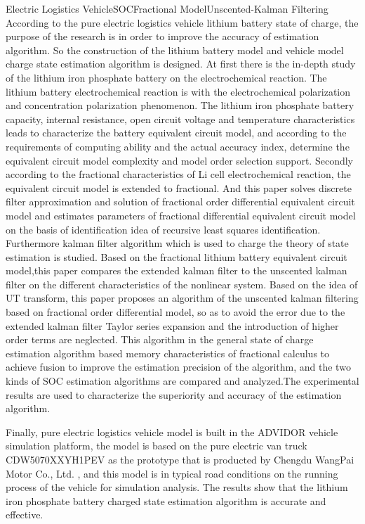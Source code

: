 \begin{Eabstract}{Electric Logistics Vehicle}{SOC}{Fractional Model}{Unscented-Kalman Filtering}{}
	According to the pure electric logistics vehicle lithium battery state of charge, the purpose of  the research is in order to improve the accuracy of estimation algorithm. So the construction of the lithium battery model and vehicle model charge state estimation algorithm is designed. At first there is the in-depth study of the lithium iron phosphate battery on the electrochemical reaction. The lithium battery electrochemical reaction is with the electrochemical polarization and concentration polarization phenomenon. The lithium iron phosphate battery capacity, internal resistance, open circuit voltage and temperature characteristics leads to characterize the battery equivalent circuit model, and according to the requirements of computing ability and the actual accuracy index, determine the equivalent circuit model complexity and model order selection support. Secondly according to the fractional characteristics of Li cell electrochemical reaction, the equivalent circuit model is extended to fractional. And this paper solves discrete filter approximation and solution of fractional order differential equivalent circuit model and estimates parameters of fractional differential equivalent circuit model on the basis of identification idea of recursive least squares identification. Furthermore kalman filter algorithm which is used to charge the theory of state estimation is studied. Based on the fractional lithium battery equivalent circuit model,this paper compares the extended kalman filter to the unscented kalman filter on the different characteristics of the nonlinear system. Based on the idea of UT transform, this paper proposes an algorithm of the unscented kalman filtering based on fractional order differential model, so as to avoid the error due to the extended kalman filter Taylor series expansion and the introduction of higher order terms are neglected. This algorithm in the general state of charge estimation algorithm based memory characteristics of fractional calculus to achieve fusion to improve the estimation precision of the algorithm, and the two kinds of SOC estimation algorithms are compared and analyzed.The experimental results are used to characterize the superiority and accuracy of the estimation algorithm.

	Finally, pure electric logistics vehicle model is built in the ADVIDOR vehicle simulation platform, the model is based on the pure electric van truck CDW5070XXYH1PEV as the prototype that is producted by Chengdu WangPai Motor Co., Ltd. , and this model is in typical road conditions on the running process of the vehicle for simulation analysis. The results show that the lithium iron phosphate battery charged state estimation algorithm is accurate and effective.
\end{Eabstract}
